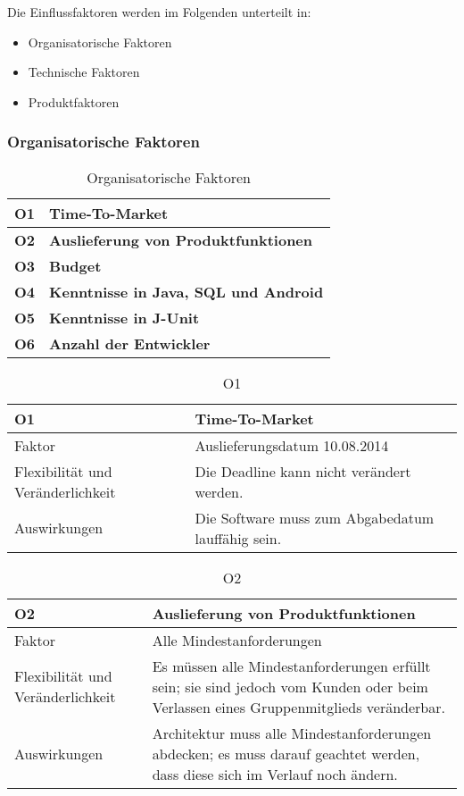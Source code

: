 Die Einflussfaktoren werden im Folgenden unterteilt in:

\begin{itemize}
\item{Organisatorische Faktoren}
\item{Technische Faktoren}
\item{Produktfaktoren}
\end{itemize}

\subsubsection{Organisatorische Faktoren}
\label{sec:orgfaktoren}

\begin{table}[H]
\centering
\caption{Organisatorische Faktoren}
\begin{tabular}{|l|l|} \hline
\textbf{O1} & \textbf{Time-To-Market} \\ \hline
\textbf{O2} & \textbf{Auslieferung von Produktfunktionen} \\ \hline
\textbf{O3} & \textbf{Budget} \\ \hline
\textbf{O4} & \textbf{Kenntnisse in Java, SQL und Android} \\ \hline
\textbf{O5} & \textbf{Kenntnisse in J-Unit} \\ \hline
\textbf{O6} & \textbf{Anzahl der Entwickler}\\ \hline
\end{tabular}
\end{table}

\begin{table}[H]
\caption{O1}
\begin{tabular}{|p{3cm}|p{12cm}|}\hline
\textbf{O1} & \textbf{Time-To-Market}\\ \hline \hline
Faktor & Auslieferungsdatum 10.08.2014\\ \hline
Flexibilität und Veränderlichkeit & Die Deadline kann nicht verändert werden.\\ \hline
Auswirkungen & Die Software muss zum Abgabedatum lauffähig sein.\\ \hline
\end{tabular}
\end{table}

\begin{table}[H]
\caption{O2}
\begin{tabular}{|p{3cm}|p{12cm}|}\hline
\textbf{O2} & \textbf{Auslieferung von Produktfunktionen}\\ \hline \hline
Faktor & Alle Mindestanforderungen\\ \hline
Flexibilität und Veränderlichkeit & Es müssen alle Mindestanforderungen erfüllt sein; sie sind jedoch vom Kunden oder beim Verlassen eines Gruppenmitglieds veränderbar.\\ \hline
Auswirkungen & Architektur muss alle Mindestanforderungen abdecken; es muss darauf geachtet werden, dass diese sich im Verlauf noch ändern.\\ \hline
\end{tabular}
\end{table}

